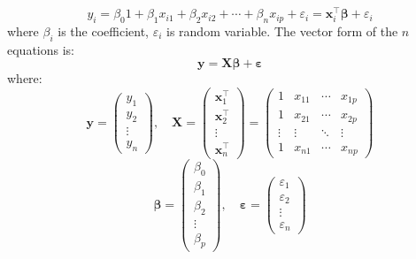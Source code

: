 \begin{enumerate}
\begin{equation}
    y_i = \beta_0 1 + \beta_1 x_{i1} + \beta_2 x_{i2} + \cdots + \beta_n x_{ip}+\varepsilon_i=\mathbf{x}_i^{\top}\mathbf{\beta} + \varepsilon_i
\end{equation}
where $\beta_i$ is the coefficient, $\varepsilon_i$ is random variable. The vector form of the $n$ equations is:
\begin{equation}
    \mathbf{y}=\mathbf{X} \boldsymbol \beta+\boldsymbol \varepsilon
\end{equation}
where:
\begin{equation*}
    \mathbf {y} =
    {\begin{pmatrix}
    y_{1}\\
    y_{2}\\
    \vdots \\
    y_{n}
    \end{pmatrix}},\quad {\mathbf{X}={
    \begin{pmatrix}
    \mathbf {x} _{1}^{\top }\\
    \mathbf {x} _{2}^{\top }\\
    \vdots \\
    \mathbf {x} _{n}^{\top }
    \end{pmatrix}}
    =
    {\begin{pmatrix}
    1&x_{11}&\cdots &x_{1p}\\
    1&x_{21}&\cdots &x_{2p}\\
    \vdots &\vdots &\ddots &\vdots \\
    1&x_{n1}&\cdots &x_{np}\end{pmatrix}}}
\end{equation*}
\begin{equation*}
    {\displaystyle {\boldsymbol {\beta }}={
    \begin{pmatrix}
    \beta _{0}\\
    \beta _{1}\\
    \beta _{2}\\
    \vdots \\
    \beta _{p}
    \end{pmatrix}},\quad {\boldsymbol {\varepsilon }}=
    {
    \begin{pmatrix}
    \varepsilon _{1}\\
    \varepsilon _{2}\\
    \vdots \\
    \varepsilon _{n}
    \end{pmatrix}}
    }
\end{equation*}


\end{enumerate}
